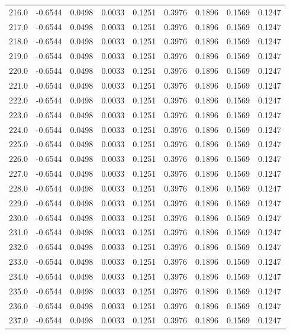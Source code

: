 \begin{longtable}{lrrrrrrrr}
216.0 & -0.6544 & 0.0498 & 0.0033 & 0.1251 & 0.3976 & 0.1896 & 0.1569 & 0.1247 \\
217.0 & -0.6544 & 0.0498 & 0.0033 & 0.1251 & 0.3976 & 0.1896 & 0.1569 & 0.1247 \\
218.0 & -0.6544 & 0.0498 & 0.0033 & 0.1251 & 0.3976 & 0.1896 & 0.1569 & 0.1247 \\
219.0 & -0.6544 & 0.0498 & 0.0033 & 0.1251 & 0.3976 & 0.1896 & 0.1569 & 0.1247 \\
220.0 & -0.6544 & 0.0498 & 0.0033 & 0.1251 & 0.3976 & 0.1896 & 0.1569 & 0.1247 \\
221.0 & -0.6544 & 0.0498 & 0.0033 & 0.1251 & 0.3976 & 0.1896 & 0.1569 & 0.1247 \\
222.0 & -0.6544 & 0.0498 & 0.0033 & 0.1251 & 0.3976 & 0.1896 & 0.1569 & 0.1247 \\
223.0 & -0.6544 & 0.0498 & 0.0033 & 0.1251 & 0.3976 & 0.1896 & 0.1569 & 0.1247 \\
224.0 & -0.6544 & 0.0498 & 0.0033 & 0.1251 & 0.3976 & 0.1896 & 0.1569 & 0.1247 \\
225.0 & -0.6544 & 0.0498 & 0.0033 & 0.1251 & 0.3976 & 0.1896 & 0.1569 & 0.1247 \\
226.0 & -0.6544 & 0.0498 & 0.0033 & 0.1251 & 0.3976 & 0.1896 & 0.1569 & 0.1247 \\
227.0 & -0.6544 & 0.0498 & 0.0033 & 0.1251 & 0.3976 & 0.1896 & 0.1569 & 0.1247 \\
228.0 & -0.6544 & 0.0498 & 0.0033 & 0.1251 & 0.3976 & 0.1896 & 0.1569 & 0.1247 \\
229.0 & -0.6544 & 0.0498 & 0.0033 & 0.1251 & 0.3976 & 0.1896 & 0.1569 & 0.1247 \\
230.0 & -0.6544 & 0.0498 & 0.0033 & 0.1251 & 0.3976 & 0.1896 & 0.1569 & 0.1247 \\
231.0 & -0.6544 & 0.0498 & 0.0033 & 0.1251 & 0.3976 & 0.1896 & 0.1569 & 0.1247 \\
232.0 & -0.6544 & 0.0498 & 0.0033 & 0.1251 & 0.3976 & 0.1896 & 0.1569 & 0.1247 \\
233.0 & -0.6544 & 0.0498 & 0.0033 & 0.1251 & 0.3976 & 0.1896 & 0.1569 & 0.1247 \\
234.0 & -0.6544 & 0.0498 & 0.0033 & 0.1251 & 0.3976 & 0.1896 & 0.1569 & 0.1247 \\
235.0 & -0.6544 & 0.0498 & 0.0033 & 0.1251 & 0.3976 & 0.1896 & 0.1569 & 0.1247 \\
236.0 & -0.6544 & 0.0498 & 0.0033 & 0.1251 & 0.3976 & 0.1896 & 0.1569 & 0.1247 \\
237.0 & -0.6544 & 0.0498 & 0.0033 & 0.1251 & 0.3976 & 0.1896 & 0.1569 & 0.1247 \\

\end{longtable}
